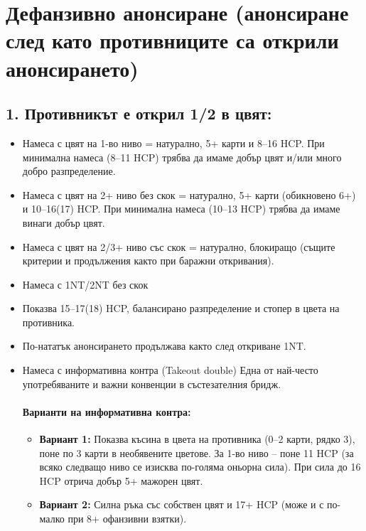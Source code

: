 \documentclass[10pt,a5paper]{extarticle}
\begin{document}
\section*{Дефанзивно анонсиране (анонсиране след като противниците са открили анонсирането)}

\subsection*{1. Противникът е открил 1/2 в цвят:}
\begin{itemize}
    \item[] Намеса с цвят на 1-во ниво = натурално, 5+ карти и 8--16 HCP.  
        При минимална намеса (8--11 HCP) трябва да имаме добър цвят и/или много добро разпределение.
    \item[] Намеса с цвят на 2+ ниво без скок = натурално, 5+ карти (обикновено 6+) и 10--16(17) HCP.  
        При минимална намеса (10--13 HCP) трябва да имаме винаги добър цвят.
    \item[] Намеса с цвят на 2/3+ ниво със скок = натурално, блокиращо (същите критерии и продължения както при баражни откривания).  


    \item[]  Намеса с 1NT/2NT без скок
    \item[] Показва 15--17(18) HCP, балансирано разпределение и стопер в цвета на противника.  
    \item[] По-нататък анонсирането продължава както след откриване 1NT.  
    \item[] Намеса с информативна контра (Takeout double)
        Една от най-често употребяваните и важни конвенции в състезателния бридж.  
        \paragraph{Варианти на информативна контра:}
        \begin{itemize}
            \item[] \textbf{Вариант 1:} Показва късина в цвета на противника (0--2 карти, рядко 3), поне по 3 карти в необявените цветове.  
                За 1-во ниво -- поне 11 HCP (за всяко следващо ниво се изисква по-голяма оньорна сила).  
                При сила до 16 HCP отрича добър 5+ мажорен цвят.  

            \item[] \textbf{Вариант 2:} Силна ръка със собствен цвят и 17+ HCP (може и с по-малко при 8+ офанзивни взятки).  


\end{itemize}
\end{itemize}
\end{document}
